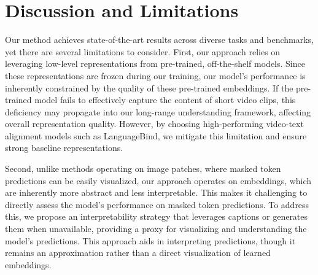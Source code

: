 \vspace{-0.8em}
\section{Discussion and Limitations}
\label{sec:disc_lim}
\vspace{-0.5em}

Our method achieves state-of-the-art results across diverse tasks and benchmarks, yet there are several limitations to consider. 
First, our approach relies on leveraging low-level representations from pre-trained, off-the-shelf models. 
Since these representations are frozen during our training, our model's performance is inherently constrained by the quality of these pre-trained embeddings. 
If the pre-trained model fails to effectively capture the content of short video clips, this deficiency may propagate into our long-range understanding framework, affecting overall representation quality. 
However, by choosing high-performing video-text alignment models such as LanguageBind, we mitigate this limitation and ensure strong baseline representations.

Second, unlike methods operating on image patches, where masked token predictions can be easily visualized, our approach operates on embeddings, which are inherently more abstract and less interpretable.
This makes it challenging to directly assess the model's performance on masked token predictions. 
To address this, we propose an interpretability strategy that leverages captions or generates them when unavailable, providing a proxy for visualizing and understanding the model’s predictions. 
This approach aids in interpreting predictions, though it remains an approximation rather than a direct visualization of learned embeddings.